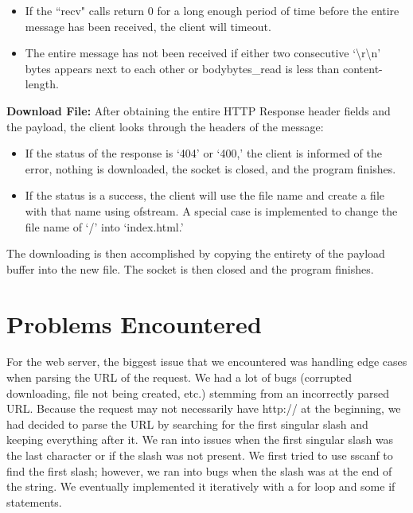 \documentclass{article}
\begin{document}
\begin{enumerate}
\begin{itemize}
                \item If the ``recv" calls return 0 for a long enough period of
                    time before the entire message has been received, the
                    client will timeout.
                
                \item The entire message has not been received if either two
                    consecutive `\textbackslash r\textbackslash n' bytes
                    appears next to each other or bodybytes\_read is less than
                    content- length.
            \end{itemize}
        \end{enumerate}
    \textbf{Download File:} After obtaining the entire HTTP Response header
        fields and the payload, the client looks through the headers of the
        message:
        \begin{itemize}
            \item If the status of the response is `404' or `400,' the client
                is informed of the error, nothing is downloaded, the socket is
                closed, and the program finishes.
            \item If the status is a success, the client will use the file name
                and create a file with that name using ofstream. A special case
                is implemented to change the file name of `/' into
                `index.html.'
        \end{itemize}
        The downloading is then accomplished by copying the entirety of the
        payload buffer into the new file. The socket is then closed and the
        program finishes.

\section{Problems Encountered}
    For the web server, the biggest issue that we encountered was handling edge
    cases when parsing the URL of the request. We had a lot of bugs (corrupted
    downloading, file not being created, etc.) stemming from an incorrectly
    parsed URL. Because the request may not necessarily have http:// at the
    beginning, we had decided to parse the URL by searching for the first
    singular slash and keeping everything after it. We ran into issues when the
    first singular slash was the last character or if the slash was not
    present. We first tried to use sscanf to find the first slash; however, we
    ran into bugs when the slash was at the end of the string. We eventually
    implemented it iteratively with a for loop and some if statements.
\end{document}
